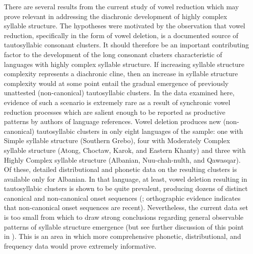   There are several results from the current study of vowel reduction which may prove relevant in addressing the diachronic development of highly complex syllable structure. The hypotheses were motivated by the observation that vowel reduction, specifically in the form of vowel deletion, is a documented source of tautosyllabic consonant clusters. It should therefore be an important contributing factor to the development of the long consonant clusters characteristic of languages with highly complex syllable structure. If increasing syllable structure complexity represents a diachronic cline, then an increase in syllable structure complexity would at some point entail the gradual emergence of previously unattested (non-canonical) tautosyllabic clusters. In the data examined here, evidence of such a scenario is extremely rare as a result of synchronic vowel reduction processes which are salient enough to be reported as productive patterns by authors of language references. Vowel deletion produces new (non-canonical) tautosyllabic clusters in only eight languages of the sample: one with Simple syllable structure (Southern Grebo), four with Moderately Complex syllable structure (Atong, Choctaw, Karok, and Eastern Khanty) and three with Highly Complex syllable structure (Albanian, Nuu-chah-nulth, and Qawasqar). Of these, detailed distributional and phonetic data on the resulting clusters is available only for Albanian. In that language, at least, vowel deletion resulting in tautosyllabic clusters is shown to be quite prevalent, producing dozens of distinct canonical and non-canonical onset sequences (\citealt{Klippenstein2010}; orthographic evidence indicates that non-canonical onset sequences are recent). Nevertheless, the current data set is too small from which to draw strong conclusions regarding general observable patterns of syllable structure emergence (but see further discussion of this point in ). This is an area in which more comprehensive phonetic, distributional, and frequency data would prove extremely informative.

